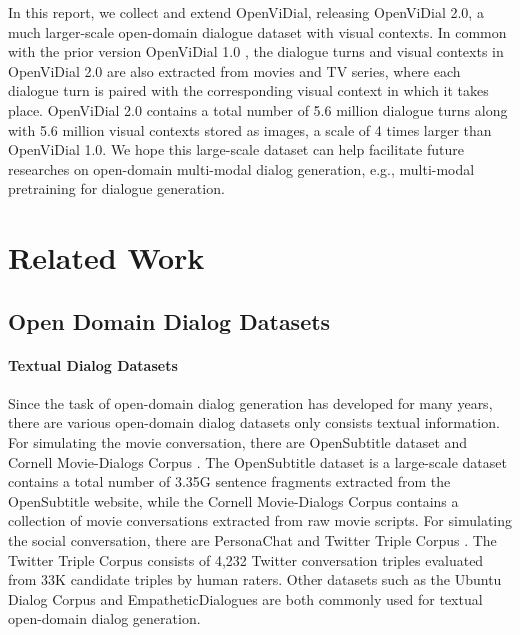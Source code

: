 \documentclass[11pt,a4paper]{article}
\begin{document}
In this report, we collect and extend OpenViDial, releasing OpenViDial 2.0, a much larger-scale open-domain dialogue dataset with visual contexts. In common with the prior version OpenViDial 1.0 \citep{meng2020openvidial}, the dialogue turns and visual contexts in OpenViDial 2.0 are also extracted from movies and TV series, where each dialogue turn is paired with the corresponding visual context in which it takes place. OpenViDial 2.0 contains a total number of 5.6 million dialogue turns along with 5.6 million visual contexts stored as images, a scale of 4 times larger than OpenViDial 1.0. 
We hope this large-scale dataset can help facilitate future researches on open-domain multi-modal dialog generation, e.g., multi-modal pretraining for dialogue generation. 

\section{Related Work}
\subsection{Open Domain Dialog Datasets}

\paragraph{Textual Dialog Datasets} Since the task of open-domain dialog generation has developed for many years, there are various open-domain dialog datasets only consists textual information. For simulating the movie conversation, there are OpenSubtitle dataset \citep{Tiedemann2009NewsFO, Lison2016OpenSubtitles2016EL} and Cornell Movie-Dialogs Corpus \citep{Danescu-Niculescu-Mizil+Lee:11a}. The OpenSubtitle dataset is a large-scale dataset contains a total number of 3.35G sentence fragments extracted from the OpenSubtitle website, while the Cornell Movie-Dialogs Corpus contains a collection of movie conversations extracted from raw movie scripts. For simulating the social conversation, there are PersonaChat \cite{zhang2018personalizing} and Twitter Triple Corpus \cite{sordoni2015neural}. The Twitter Triple Corpus consists of 4,232 Twitter conversation triples evaluated from 33K candidate triples by human raters. Other datasets such as the Ubuntu Dialog Corpus \cite{lowe2015ubuntu} and EmpatheticDialogues \cite{rashkin2018towards} are both commonly used for textual open-domain dialog generation.
\end{document}
